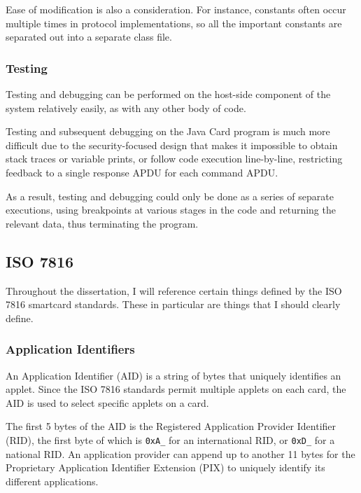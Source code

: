 \documentclass[12pt,a4paper]{article}
\begin{document}
Ease of modification is also a consideration. For instance, constants often occur multiple times in protocol implementations, so all the important constants are separated out into a separate class file.

\subsubsection{Testing}
\label{subsec:testing}

Testing and debugging can be performed on the host-side component of the system relatively easily, as with any other body of code.

Testing and subsequent debugging on the Java Card program is much more difficult due to the security-focused design that makes it impossible to obtain stack traces or variable prints, or follow code execution line-by-line, restricting feedback to a single response APDU for each command APDU.
 
As a result, testing and debugging could only be done as a series of separate executions, using breakpoints at various stages in the code and returning the relevant data, thus terminating the program. 




\subsection{ISO 7816}
Throughout the dissertation, I will reference certain things defined by the ISO 7816 smartcard standards. These in particular are things that I should clearly define.


\subsubsection{Application Identifiers}
\label{subsec:aid}
An Application Identifier (AID) is a string of bytes that uniquely identifies an applet. Since the ISO 7816 standards permit multiple applets on each card, the AID is used to select specific applets on a card. 

The first 5 bytes of the AID is the Registered Application Provider Identifier (RID), the first byte of which is \verb|0xA_| for an international RID, or \verb|0xD_| for a national RID. An application provider can append up to another 11 bytes for the Proprietary Application Identifier Extension (PIX) to uniquely identify its different applications.
\end{document}
